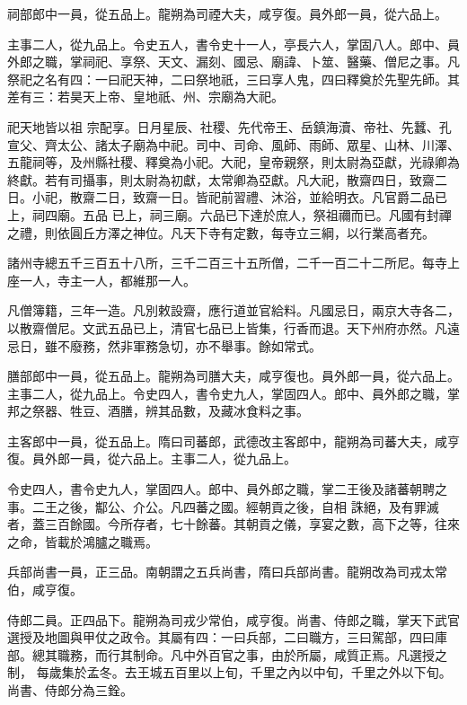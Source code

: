 \begin{pinyinscope}
 祠部郎中一員，從五品上。龍朔為司禋大夫，咸亨復。員外郎一員，從六品上。



 主事二人，從九品上。令史五人，書令史十一人，亭長六人，掌固八人。郎中、員外郎之職，掌祠祀、享祭、天文、漏刻、國忌、廟諱、卜筮、醫藥、僧尼之事。凡祭祀之名有四：一曰祀天神，二曰祭地祇，三曰享人鬼，四曰釋奠於先聖先師。其差有三：若昊天上帝、皇地祇、州、宗廟為大祀。



 祀天地皆以祖
 宗配享。日月星辰、社稷、先代帝王、岳鎮海瀆、帝社、先蠶、孔宣父、齊太公、諸太子廟為中祀。司中、司命、風師、雨師、眾星、山林、川澤、五龍祠等，及州縣社稷、釋奠為小祀。大祀，皇帝親祭，則太尉為亞獻，光祿卿為終獻。若有司攝事，則太尉為初獻，太常卿為亞獻。凡大祀，散齋四日，致齋二日。小祀，散齋二日，致齋一日。皆祀前習禮、沐浴，並給明衣。凡官爵二品已上，祠四廟。五品
 已上，祠三廟。六品已下達於庶人，祭祖禰而已。凡國有封禪之禮，則依圓丘方澤之神位。凡天下寺有定數，每寺立三綱，以行業高者充。



 諸州寺總五千三百五十八所，三千二百三十五所僧，二千一百二十二所尼。每寺上座一人，寺主一人，都維那一人。



 凡僧簿籍，三年一造。凡別敕設齋，應行道並官給料。凡國忌日，兩京大寺各二，以散齋僧尼。文武五品已上，清官七品已上皆集，行香而退。天下州府亦然。凡遠忌日，雖不廢務，然非軍務急切，亦不舉事。餘如常式。



 膳部郎中一員，從五品上。龍朔為司膳大夫，咸亨復也。員外郎一員，從六品上。主事二人，從九品上。令史四人，書令史九人，掌固四人。郎中、員外郎之職，掌邦之祭器、牲豆、酒膳，辨其品數，及藏冰食料之事。



 主客郎中一員，從五品上。隋曰司蕃郎，武德改主客郎中，龍朔為司蕃大夫，咸亨復。員外郎一員，從六品上。主事二人，從九品上。



 令史四人，書令史九人，掌固四人。郎中、員外郎之職，掌二王後及諸蕃朝聘之事。二王之後，酅公、介公。凡四蕃之國。經朝貢之後，自相
 誅絕，及有罪滅者，蓋三百餘國。今所存者，七十餘蕃。其朝貢之儀，享宴之數，高下之等，往來之命，皆載於鴻臚之職焉。



 兵部尚書一員，正三品。南朝謂之五兵尚書，隋曰兵部尚書。龍朔改為司戎太常伯，咸亨復。



 侍郎二員。正四品下。龍朔為司戎少常伯，咸亨復。尚書、侍郎之職，掌天下武官選授及地圖與甲仗之政令。其屬有四：一曰兵部，二曰職方，三曰駕部，四曰庫部。總其職務，而行其制命。凡中外百官之事，由於所屬，咸質正焉。凡選授之制，
 每歲集於孟冬。去王城五百里以上旬，千里之內以中旬，千里之外以下旬。尚書、侍郎分為三銓。




\end{pinyinscope}

